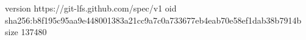 version https://git-lfs.github.com/spec/v1
oid sha256:b8f195c95aa9e448001383a21cc9a7c0a733677eb4eab70e58ef1dab38b7914b
size 137480
